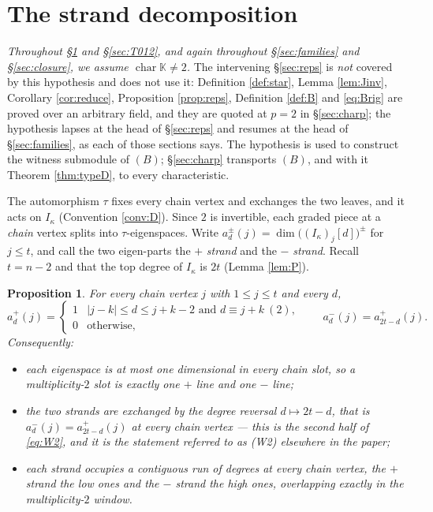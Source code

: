 \documentclass[reqno]{amsart}
\theoremstyle{plain}
\newtheorem{proposition}[theorem]{Proposition}
\theoremstyle{definition}
\newcommand{\ka}{\kappa}
\begin{document}
\section{The strand decomposition}\label{sec:strands}

\emph{Throughout \S\ref{sec:strands} and \S\ref{sec:T012}, and again throughout
\S\ref{sec:families} and \S\ref{sec:closure}, we assume
$\operatorname{char}\mathbb{K}\ne2$.}  The intervening \S\ref{sec:reps} is
\emph{not} covered by this hypothesis and does not use it: Definition
\ref{def:star}, Lemma \ref{lem:Jinv}, Corollary \ref{cor:reduce}, Proposition
\ref{prop:reps}, Definition \ref{def:B} and \eqref{eq:Brig} are proved over an
arbitrary field, and they are quoted at $p=2$ in \S\ref{sec:charp}; the
hypothesis lapses at the head of \S\ref{sec:reps} and resumes at the head of
\S\ref{sec:families}, as each of those sections says.  The hypothesis is used
to construct the witness submodule of $(B)$; \S\ref{sec:charp} transports
$(B)$, and with it Theorem \ref{thm:typeD}, to every characteristic.

The automorphism $\tau$ fixes every chain vertex and exchanges the two leaves,
and it acts on $I_\ka$ (Convention \ref{conv:D}).  Since $2$ is invertible,
each graded piece at a \emph{chain} vertex splits into $\tau$-eigenspaces.
Write $a^{\pm}_d(j)=\dim\bigl((I_\ka)_j[d]\bigr)^{\pm}$ for $j\le t$, and call
the two eigen-parts the $+$ \emph{strand} and the $-$ \emph{strand}.  Recall
$t=n-2$ and that the top degree of $I_\ka$ is $2t$ (Lemma \ref{lem:P}).

\begin{proposition}\label{prop:W2}
For every chain vertex $j$ with $1\le j\le t$ and every $d$,
\begin{equation}\label{eq:W2}
   a^{+}_d(j)=
   \begin{cases}
     1 & |j-k|\le d\le j+k-2 \text{ and } d\equiv j+k \ (2),\\
     0 & \text{otherwise},
   \end{cases}
   \qquad
   a^{-}_d(j)=a^{+}_{2t-d}(j).
\end{equation}
Consequently:
\begin{itemize}\itemsep1pt
\item[\textup{(W1)}] each eigenspace is at most one dimensional in every chain
slot, so a multiplicity-$2$ slot is exactly one $+$ line and one $-$ line;
\item[\textup{(W2)}] the two strands are exchanged by the degree reversal
$d\mapsto2t-d$, that is $a^{-}_d(j)=a^{+}_{2t-d}(j)$ at every chain vertex ---
this is the second half of \eqref{eq:W2}, and it is the statement referred to
as \textup{(W2)} elsewhere in the paper;
\item[\textup{(W3)}] each strand occupies a contiguous run of degrees at every
chain vertex, the $+$ strand the low ones and the $-$ strand the high ones,
overlapping exactly in the multiplicity-$2$ window.
\end{itemize}
\end{proposition}
\end{document}
